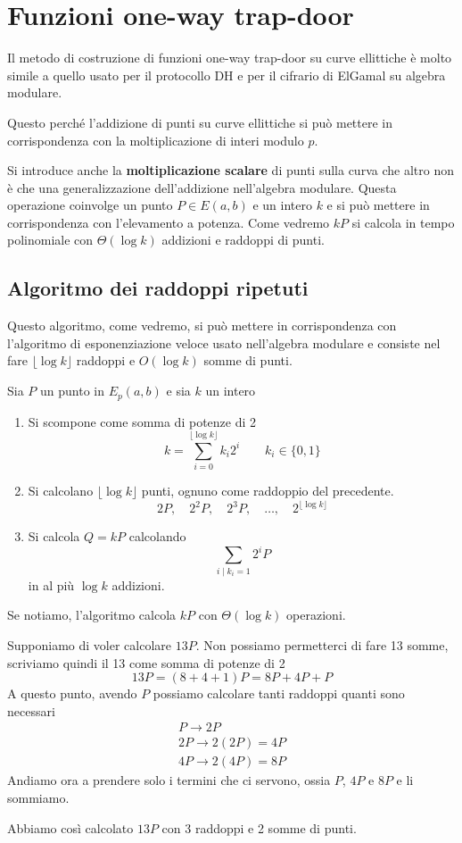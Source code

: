 \section{Funzioni one-way trap-door}
Il metodo di costruzione di funzioni one-way trap-door su curve ellittiche \`e molto simile a quello usato per
il protocollo DH e per il cifrario di ElGamal su algebra modulare.

Questo perch\'e l'addizione di punti su curve ellittiche si pu\`o mettere in corrispondenza con la moltiplicazione
di interi modulo $p$.

Si introduce anche la \textbf{moltiplicazione scalare} di punti sulla curva che altro non \`e che una
generalizzazione dell'addizione nell'algebra modulare. Questa operazione coinvolge un punto $P \in E(a, b)$ e un
intero $k$ e si pu\`o mettere in corrispondenza con l'elevamento a potenza. Come vedremo $k P$ si calcola
in tempo polinomiale con $\Theta(\log k)$ addizioni e raddoppi di punti.

\subsection{Algoritmo dei raddoppi ripetuti}
Questo algoritmo, come vedremo, si pu\`o mettere in corrispondenza con l'algoritmo di esponenziazione veloce usato
nell'algebra modulare e consiste nel fare $\lfloor \log k \rfloor$ raddoppi e $O(\log k)$ somme di punti.

Sia $P$ un punto in $E_p(a, b)$ e sia $k$ un intero
\begin{enumerate}
	\item Si scompone come somma di potenze di 2
	      \[ k = \sum_{i=0}^{\lfloor \log k \rfloor} k_i 2^i \quad \quad k_i \in \{ 0, 1 \} \]
	\item Si calcolano $\lfloor \log k \rfloor$ punti, ognuno come raddoppio del precedente.
	      \[ 2P, \quad 2^2P, \quad 2^3 P, \quad \dots, \quad 2^{\lfloor\log k \rfloor} \]
	\item Si calcola $Q = kP$ calcolando
	      \[ \sum_{i \mid k_i = 1} 2^i P \]
	      in al pi\`u $\log k$ addizioni.
\end{enumerate}
Se notiamo, l'algoritmo calcola $kP$ con $\Theta(\log k)$ operazioni.

\begin{example}
	Supponiamo di voler calcolare $13P$. Non possiamo permetterci di fare 13 somme, scriviamo quindi il 13 come
	somma di potenze di 2
	\[ 13P = (8 + 4 + 1) P = 8P + 4P + P \]
	A questo punto, avendo $P$ possiamo calcolare tanti raddoppi quanti sono necessari
	\[
		\begin{matrix}
			P \rightarrow 2P          \\
			2P \rightarrow 2(2P) = 4P \\
			4P \rightarrow 2(4P) = 8P
		\end{matrix}
	\]
	Andiamo ora a prendere solo i termini che ci servono, ossia $P$, $4P$ e $8P$ e li sommiamo.

	Abbiamo cos\`i calcolato $13P$ con 3 raddoppi e 2 somme di punti.
\end{example}

